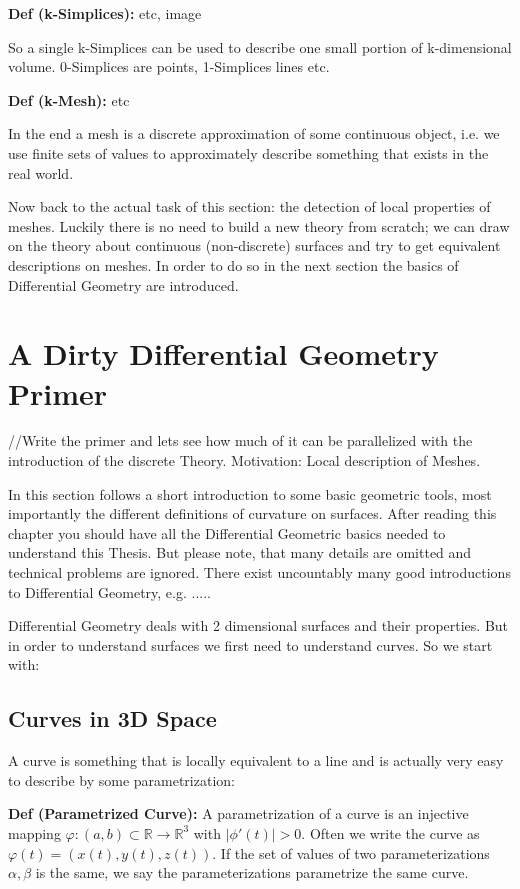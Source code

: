 	\textbf{Def (k-Simplices):} etc, image
	
So a single k-Simplices	can be used to describe one small portion of k-dimensional volume. 0-Simplices are points, 1-Simplices lines etc.
	
	\textbf{Def (k-Mesh):} etc
	
	In the end a mesh is a discrete approximation of some continuous object, i.e. we use finite sets of values to approximately describe  something that exists in the real world.
	
	Now back to the actual task of this section: the detection of local properties of meshes. Luckily there is no need to build a new theory from scratch; we can draw on the theory about continuous (non-discrete) surfaces and try to get equivalent descriptions on meshes. In order to do so in the next section the basics of Differential Geometry are introduced.
	
	
	\section{A Dirty Differential Geometry Primer}
	
	//Write the primer and lets see how much of it can be parallelized with the introduction of the discrete Theory.
	Motivation: Local description of Meshes. 
	
	In this section follows a short introduction to some basic geometric tools, most importantly the different definitions of curvature on surfaces. After reading this chapter you should have all the Differential Geometric basics needed to understand this Thesis. But please note, that many details are omitted and technical problems are ignored. There exist uncountably many good introductions to Differential Geometry, e.g. .....
	
	Differential Geometry deals with 2 dimensional surfaces and their properties. But in order to understand surfaces we first need to understand curves. So we start with:
	
	\subsection{Curves in 3D Space}

	A curve is something that is locally equivalent to a line and is actually very easy to describe by some parametrization:
	
	\textbf{Def (Parametrized Curve):}  A parametrization of a curve is an injective mapping $ \varphi: (a,b) \subset \mathbb R \to \mathbb R^3$ with $|\phi'(t)|>0$. Often we write the curve as $\varphi(t) = (x(t), y(t), z(t))$. If the set of values of two parameterizations $\alpha, \beta$ is the same, we say the parameterizations parametrize the same curve.
	
